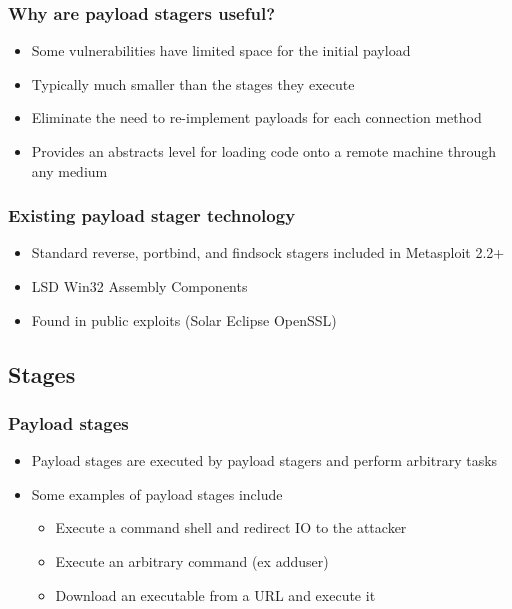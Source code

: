 \documentclass{beamer}
\newenvironment{sitemize}{\vspace{1mm}\begin{itemize}\itemsep 4pt\small}{\end{itemize}}
\begin{document}
\begin{frame}[t]
    \frametitle{Why are payload stagers useful?}

    \begin{sitemize}
        \item Some vulnerabilities have limited space for the
        initial payload

        \item Typically much smaller than the stages
        they execute

        \pause
        \item Eliminate the need to re-implement payloads for each
        connection method

        \pause
	\item Provides an abstracts level for loading code onto a remote
	machine through any medium
    \end{sitemize}
\end{frame}

\begin{frame}[t]
    \frametitle{Existing payload stager technology}

    \begin{sitemize}
        \item Standard reverse, portbind, and findsock stagers
        included in Metasploit 2.2+

	\item LSD Win32 Assembly Components

	\item Found in public exploits (Solar Eclipse OpenSSL)

    \end{sitemize}
\end{frame}

\subsection{Stages}
\begin{frame}[t]
    \frametitle{Payload stages}

    \begin{sitemize}
        \item Payload stages are executed by payload stagers and
        perform arbitrary tasks

        \pause
        \item Some examples of payload stages include
        \begin{sitemize}
            \item Execute a command shell and redirect IO to the
            attacker
            \item Execute an arbitrary command (ex adduser)
            \item Download an executable from a URL and execute it
        \end{sitemize}
    \end{sitemize}
\end{frame}
\end{document}

